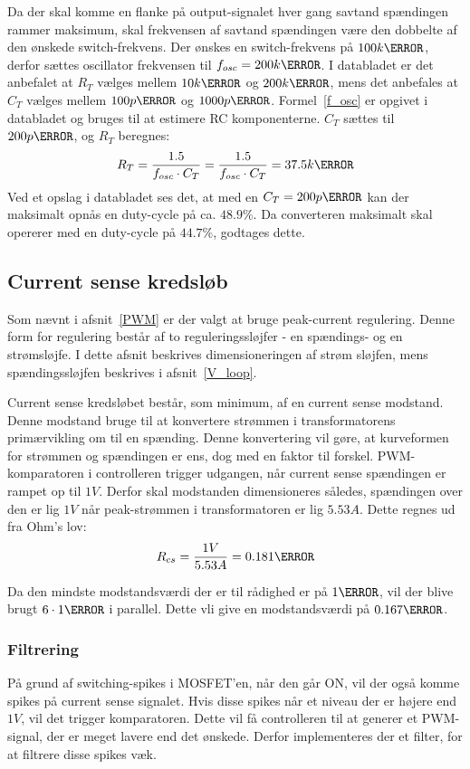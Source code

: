 Da der skal komme en flanke på output-signalet hver gang savtand spændingen rammer maksimum, skal frekvensen af savtand spændingen være den dobbelte af den ønskede switch-frekvens. Der ønskes en switch-frekvens på $100k\hertz$, derfor sættes oscillator frekvensen til $f_{osc}=200k\hertz$. I databladet er det anbefalet at $R_T$ vælges mellem $10k\ohm$ og $200k\ohm$, mens det anbefales at $C_T$ vælges mellem $100p\farad$ og $1000p\farad$. Formel~\ref{f_osc} er opgivet i databladet og bruges til at estimere RC komponenterne. $C_T$ sættes til $200p\farad$, og $R_T$ beregnes:
\begin{equation} \label{f_osc}
R_{T} = \frac{1.5}{f_{osc} \cdot C_T} = \frac{1.5}{f_{osc} \cdot C_T} = 37.5k\ohm
\end{equation}
Ved et opslag i databladet ses det, at med en $C_T=200p\farad$ kan der maksimalt opnås en duty-cycle på ca. $48.9\percent$. Da converteren maksimalt skal opererer med en duty-cycle på $44.7\percent$, godtages dette.

\subsection{Current sense kredsløb} \label{CS_loop}
Som nævnt i afsnit~\ref{PWM} er der valgt at bruge peak-current regulering. Denne form for regulering består af to reguleringssløjfer - en spændings- og en strømsløjfe. I dette afsnit beskrives dimensioneringen af strøm sløjfen, mens spændingssløjfen beskrives i afsnit~\ref{V_loop}.

Current sense kredsløbet består, som minimum, af en current sense modstand. Denne modstand bruge til at konvertere strømmen i transformatorens primærvikling om til en spænding. Denne konvertering vil gøre, at kurveformen for strømmen og spændingen er ens, dog med en faktor til forskel. PWM-komparatoren i controlleren trigger udgangen, når current sense spændingen er rampet op til $1V$. Derfor skal modstanden dimensioneres således, spændingen over den er lig $1V$ når peak-strømmen i transformatoren er lig $5.53A$. Dette regnes ud fra Ohm's lov:
\begin{equation} \label{R_cs}
R_{cs} = \frac{1V}{5.53A} = 0.181\ohm
\end{equation}

Da den mindste modstandsværdi der er til rådighed er på $1\ohm$, vil der blive brugt $6\cdot 1\ohm$ i parallel. Dette vli give en modstandsværdi på $0.167\ohm$.



\subsubsection{Filtrering}
På grund af switching-spikes i MOSFET'en, når den går ON, vil der også komme spikes på current sense signalet. Hvis disse spikes når et niveau der er højere end $1V$, vil det trigger komparatoren. Dette vil få controlleren til at generer et PWM-signal, der er meget lavere end det ønskede. Derfor implementeres der et filter, for at filtrere disse spikes væk.

